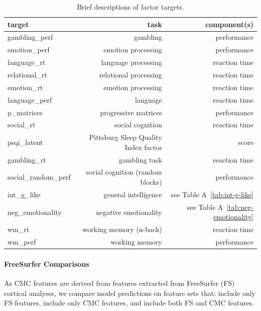 \documentclass{article}
\begin{document}
\begin{table}
\centering
\begin{tabular}{lrr}
	\toprule
	target & task & component(s)  \\
	\midrule
	gambling\_perf       & gambling              & performance   \\
	emotion\_perf        & emotion processing    & performance   \\
	language\_rt         & language processing   & reaction time \\
	relational\_rt       & relational processing & reaction time \\
	emotion\_rt          & emotion processing    & reaction time \\
	language\_perf       & language              & reaction time \\
	p\_matrices          & progressive matrices  & performance   \\
	social\_rt           & social cognition      & reaction time \\
	psqi\_latent         & Pittsburg Sleep Quality Index factor \citep{buyssePittsburghSleepQuality1989} & score \\
	gambling\_rt         & gambling task         & reaction time \\
	social\_random\_perf & social cognition (random blocks) & performance \\
	int\_g\_like         & general intelligence & see Table A~\ref{tab:int-g-like} \\
	neg\_emotionality    & negative emotionality & see Table A~\ref{tab:neg-emotionality} \\
	wm\_rt               & working memory (n-back) & reaction time \\
	wm\_perf             & working memory          & performance \\
	\bottomrule
\end{tabular}
\footnotesize
\caption{Brief descriptions of factor targets. } \label{tab:target-descs}
\normalsize
\end{table}

\paragraph{FreeSurfer Comparisons}

As CMC features are derived from features extracted from FreeSurfer (FS)
cortical analyses, we compare model predictions on feature sets that: include
only FS features, include only CMC features, and include both FS and CMC
features.
\end{document}
